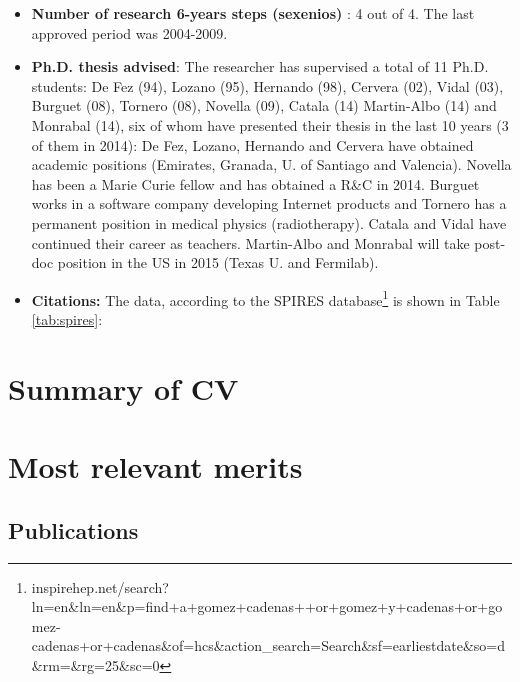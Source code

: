\documentclass[a4paper,11pt,oneside]{article}
\begin{document}
\begin{itemize}
\item {\bf Number of research 6-years steps (sexenios) }: 4 out of 4. The last approved period was 2004-2009. 
\item {\bf Ph.D. thesis advised}: The researcher has supervised a total of 11 Ph.D. students: De Fez (94), Lozano (95), Hernando (98), Cervera (02), Vidal (03), Burguet (08), Tornero (08), Novella (09), Catala (14) Martin-Albo (14) and Monrabal (14), six of whom have presented their thesis in the last 10 years (3 of them in 2014): De Fez, Lozano, Hernando and Cervera have obtained academic positions (Emirates, Granada, U. of Santiago and Valencia). Novella has been a Marie Curie fellow and has obtained a R\&C in 2014. Burguet works in a software company developing Internet products and Tornero has a permanent position in medical physics (radiotherapy). Catala and Vidal have continued their career as teachers. Martin-Albo and Monrabal will take post-doc position in the US in 2015 (Texas U. and Fermilab). 
\item{\bf Citations:} The data, according to the SPIRES database\footnote{inspirehep.net/search?ln=en\&ln=en\&p=find+a+gomez+cadenas++or+gomez+y+cadenas+or+gomez-cadenas+or+cadenas\&of=hcs\&action\_search=Search\&sf=earliestdate\&so=d\&rm=\&rg=25\&sc=0} is shown in Table \ref{tab:spires}:
\end{itemize}

\section{Summary of CV}

\section{Most relevant merits}
\subsection{Publications}

\end{document}
